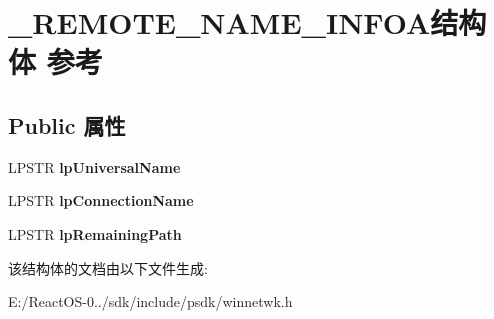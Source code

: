 \hypertarget{struct___r_e_m_o_t_e___n_a_m_e___i_n_f_o_a}{}\section{\+\_\+\+R\+E\+M\+O\+T\+E\+\_\+\+N\+A\+M\+E\+\_\+\+I\+N\+F\+O\+A结构体 参考}
\label{struct___r_e_m_o_t_e___n_a_m_e___i_n_f_o_a}
\subsection*{Public 属性}
\begin{DoxyCompactItemize}
\item 
\mbox{\label{struct___r_e_m_o_t_e___n_a_m_e___i_n_f_o_a_abb23836b97a8b151e2e3b309b7f6d056}} 
L\+P\+S\+TR {\bfseries lp\+Universal\+Name}
\item 
\mbox{\label{struct___r_e_m_o_t_e___n_a_m_e___i_n_f_o_a_a234d6445daa6f6ea41f0a29358409fcf}} 
L\+P\+S\+TR {\bfseries lp\+Connection\+Name}
\item 
\mbox{\label{struct___r_e_m_o_t_e___n_a_m_e___i_n_f_o_a_a762d9df3366ff1b218b5732ecf72c011}} 
L\+P\+S\+TR {\bfseries lp\+Remaining\+Path}
\end{DoxyCompactItemize}


该结构体的文档由以下文件生成\+:\begin{DoxyCompactItemize}
\item 
E\+:/\+React\+O\+S-\/0../sdk/include/psdk/winnetwk.\+h\end{DoxyCompactItemize}
